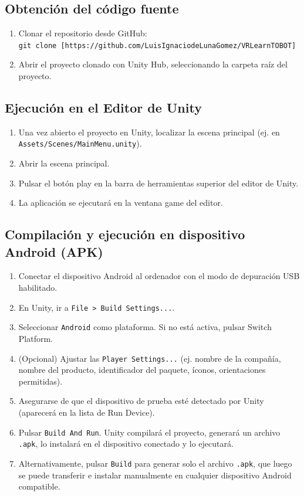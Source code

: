 \subsection{Obtención del código fuente}
\begin{enumerate}
	\item Clonar el repositorio desde GitHub: \\
	\texttt{git clone [https://github.com/LuisIgnaciodeLunaGomez/VRLearnTOBOT]}
	\item Abrir el proyecto clonado con Unity Hub, seleccionando la carpeta raíz del proyecto.
\end{enumerate}

\subsection{Ejecución en el Editor de Unity}
\begin{enumerate}
	\item Una vez abierto el proyecto en Unity, localizar la escena principal (ej. en \texttt{Assets/Scenes/MainMenu.unity}).
	\item Abrir la escena principal.
	\item Pulsar el botón play en la barra de herramientas superior del editor de Unity.
	\item La aplicación se ejecutará en la ventana game del editor.
\end{enumerate}

\subsection{Compilación y ejecución en dispositivo Android (APK)}
\begin{enumerate}
	\item Conectar el dispositivo Android al ordenador con el modo de depuración USB habilitado.
	\item En Unity, ir a \texttt{File > Build Settings...}.
	\item Seleccionar \texttt{Android} como plataforma. Si no está activa, pulsar Switch Platform.
	\item (Opcional) Ajustar las \texttt{Player Settings...} (ej. nombre de la compañía, nombre del producto, identificador del paquete, íconos, orientaciones permitidas).
	\item Asegurarse de que el dispositivo de prueba esté detectado por Unity (aparecerá en la lista de Run Device).
	\item Pulsar \texttt{Build And Run}. Unity compilará el proyecto, generará un archivo \texttt{.apk}, lo instalará en el dispositivo conectado y lo ejecutará.
	\item Alternativamente, pulsar \texttt{Build} para generar solo el archivo \texttt{.apk}, que luego se puede transferir e instalar manualmente en cualquier dispositivo Android compatible.
\end{enumerate}

